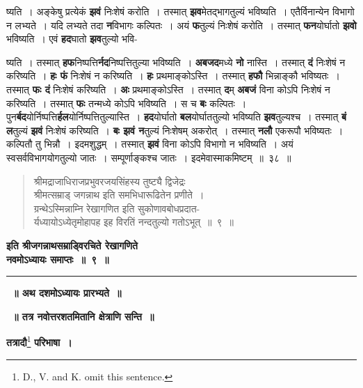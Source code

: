 \documentclass[11pt, openany]{book}
\begin{document}
\noindent ष्यति~। अङ्केषु प्रत्येकं \textbf{झवं} निःशेषं करोति~। तस्मात् \textbf{झव}मेतद्भागतुल्यं भविष्यति~। एतैर्विनान्येन विभागो न लभ्यते~। यदि लभ्यते तदा \textbf{न}विभागः कल्पितः~। अयं \textbf{फ}तुल्यं निःशेषं करोति~। तस्मात् \textbf{फन}योर्घातो \textbf{झवो} भविष्यति~। एवं \textbf{हद}घातो \textbf{झव}तुल्यो भवि- 

\newpage
\noindent ष्यति~। तस्मात् \textbf{हफ}निष्पत्ति\textbf{र्नद}निष्पत्तितुल्या भविष्यति~। \textbf{अबजद}मध्ये \textbf{नो} नास्ति~। तस्मात् \textbf{दं} निःशेषं न करिष्यति~। \textbf{हः फं} निःशेषं न करिष्यति~। \textbf{हः} प्रथमाङ्कोऽस्ति~। तस्मात् \textbf{हफौ} भिन्नाङ्कौ भविष्यतः~। तस्मात् \textbf{फः दं} निःशेषं करिष्यति~। \textbf{अः} प्रथमाङ्कोऽस्ति~। तस्मात् \textbf{द}म् \textbf{अबजं} विना कोऽपि निःशेषं न करिष्यति~। तस्मात् \textbf{फः} तन्मध्ये कोऽपि भविष्यति~। स च \textbf{बः} कल्पितः~। पुन\textbf{र्बद}योर्निष्पत्ति\textbf{र्हल}योर्निष्पत्तितुल्यास्ति~। \textbf{हद}योर्घातो \textbf{बल}योर्घाततुल्यो भविष्यति \textbf{झव}तुल्यश्च~। तस्मात् \textbf{बं ल}तुल्यं \textbf{झवं} निःशेषं करिष्यति~। \textbf{बः झवं न}तुल्यं निःशेषम् अकरोत्~। तस्मात् \textbf{नलौ} एकरूपौ भविष्यतः~। कल्पितौ तु भिन्नौ~। इदमशुद्धम्~। तस्मात् \textbf{झवं} विना कोऽपि विभागो न भविष्यति~। अयं स्वसर्वविभागयोगतुल्यो जातः~। सम्पूर्णाङ्कश्च जातः~। इदमेवास्माकमिष्टम्~॥~३८~॥  

\begin{quote}
\qt
श्रीमद्राजाधिराजप्रभुवरजयसिंहस्य तुष्ट्यै द्विजेद्रः \\
श्रीमत्सम्राड् जगन्नाथ इति समभिधारूढितेन प्रणीते~। \\
 ग्रन्थेऽस्मिन्नाम्नि रेखागणित इति सुकोणावबोधप्रदात- \\
 र्यध्यायोऽध्येतृमोहापह इह विरतिं नन्दतुल्यो गतोऽभूत्~॥~९~॥ 
\end{quote}
\vspace{-1mm}

\begin{center}
\textbf{इति श्रीजगन्नाथसम्राड्विरचिते रेखागणिते \\
नवमोऽध्यायः समाप्तः~॥~९~॥}\\
\vspace{6mm} 

\rule{0.9in}{0.8pt}
\end{center}

\afterpage{\fancyhead[LE,RO]{\thepage}}
\cfoot{}

\newpage%
\thispagestyle{empty}
 \label{ch10}
\begin{center}
{\bf \LARGE~॥ अथ दशमोऽध्यायः प्रारभ्यते~॥}
\vspace{5mm}

\textbf{~॥ तत्र नवोत्तरशतमितानि क्षेत्राणि सन्ति~॥}
\vspace{5mm}

 \textbf{\large  तत्रादौ}\renewcommand{\thefootnote}{१}\footnote{\en D., V. and K. omit this sentence.} \textbf{परिभाषा~।}
\end{center}
\end{document}
